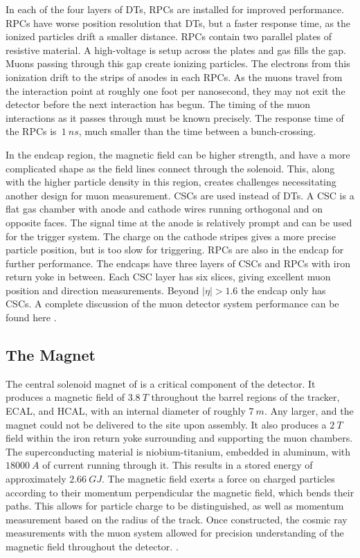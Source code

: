 In each of the four layers of DTs, RPCs are installed for improved performance.  RPCs have worse position resolution that DTs, but a faster response time, as the ionized particles drift a smaller distance.  RPCs contain two parallel plates of resistive material.  A high-voltage is setup across the plates and gas fills the gap.  Muons passing through this gap create ionizing particles.  The electrons from this ionization drift to the strips of anodes in each RPCs.  As the muons travel from the interaction point at roughly one foot per nanosecond, they may not exit the detector before the next interaction has begun.  The timing of the muon interactions as it passes through must be known precisely.  The response time of the RPCs is~\ensuremath{\SI{1}{ns}}, much smaller than the time between a bunch-crossing.

In the endcap region, the magnetic field can be higher strength, and have a more complicated shape as the field lines connect through the solenoid. This, along with the higher particle density in this region, creates challenges necessitating another design for muon measurement. CSCs are used instead of DTs. A CSC is a flat gas chamber with anode and cathode wires running orthogonal and on opposite faces. The signal time at the anode is relatively prompt and can be used for the \CMS trigger system. The charge on the cathode stripes gives a more precise particle position, but is too slow for triggering. RPCs are also in the endcap for further performance. The endcaps have three layers of CSCs and RPCs with iron return yoke in between. Each CSC layer has six slices, giving excellent muon position and direction measurements.  Beyond \ensuremath{|\eta| > 1.6} the endcap only has CSCs. A complete discussion of the muon detector system performance can be found here \cite{muonDPG13TeV}.

\subsection{The Magnet}
The central solenoid magnet of \CMS is a critical component of the detector. It produces a magnetic field of \ensuremath{\SI{3.8}{T}} throughout the barrel regions of the tracker, ECAL, and HCAL, with an internal diameter of roughly \ensuremath{\SI{7}{m}}. Any larger, and the magnet could not be delivered to the \CMS site upon assembly. It also produces a \ensuremath{\SI{2}{T}} field within the iron return yoke surrounding and supporting the muon chambers. The superconducting material is niobium-titanium, embedded in aluminum, with \ensuremath{\SI{18000}{A}} of current running through it. This results in a stored energy of approximately \ensuremath{\SI{2.66}{GJ}}. The magnetic field exerts a force on charged particles according to their momentum perpendicular the magnetic field, which bends their paths. This allows for particle charge to be distinguished, as well as momentum measurement based on the radius of the track.  Once constructed, the cosmic ray measurements with the muon system allowed for precision understanding of the magnetic field throughout the detector.  \cite{magnet}.

